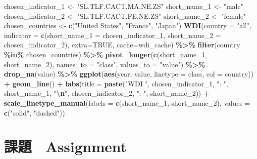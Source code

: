 \documentclass[
  xelatex, ja=standard]{bxjsbook}
\newenvironment{Shaded}{\begin{snugshade}}{\end{snugshade}}
\newcommand{\AttributeTok}[1]{\textcolor[rgb]{0.13,0.29,0.53}{#1}}
\newcommand{\ConstantTok}[1]{\textcolor[rgb]{0.56,0.35,0.01}{#1}}
\newcommand{\FunctionTok}[1]{\textcolor[rgb]{0.13,0.29,0.53}{\textbf{#1}}}
\newcommand{\NormalTok}[1]{#1}
\newcommand{\OtherTok}[1]{\textcolor[rgb]{0.56,0.35,0.01}{#1}}
\newcommand{\SpecialCharTok}[1]{\textcolor[rgb]{0.81,0.36,0.00}{\textbf{#1}}}
\newcommand{\StringTok}[1]{\textcolor[rgb]{0.31,0.60,0.02}{#1}}
\theoremstyle{definition}
\theoremstyle{definition}
\theoremstyle{definition}
\theoremstyle{definition}
\theoremstyle{remark}
\begin{document}
\begin{Shaded}
\begin{Highlighting}[]
\NormalTok{chosen\_indicator\_1 }\OtherTok{\textless{}{-}} \StringTok{"SL.TLF.CACT.MA.NE.ZS"}
\NormalTok{short\_name\_1 }\OtherTok{\textless{}{-}} \StringTok{"male"}
\NormalTok{chosen\_indicator\_2 }\OtherTok{\textless{}{-}} \StringTok{"SL.TLF.CACT.FE.NE.ZS"}
\NormalTok{short\_name\_2 }\OtherTok{\textless{}{-}} \StringTok{"female"}
\NormalTok{chosen\_countries }\OtherTok{\textless{}{-}} \FunctionTok{c}\NormalTok{(}\StringTok{"United States"}\NormalTok{, }\StringTok{"France"}\NormalTok{, }\StringTok{"Japan"}\NormalTok{)}
\FunctionTok{WDI}\NormalTok{(}\AttributeTok{country =} \StringTok{"all"}\NormalTok{, }\AttributeTok{indicator =} \FunctionTok{c}\NormalTok{(}\AttributeTok{short\_name\_1 =}\NormalTok{ chosen\_indicator\_1, }\AttributeTok{short\_name\_2 =}\NormalTok{ chosen\_indicator\_2), }\AttributeTok{extra=}\ConstantTok{TRUE}\NormalTok{, }\AttributeTok{cache=}\NormalTok{wdi\_cache) }\SpecialCharTok{\%\textgreater{}\%} 
  \FunctionTok{filter}\NormalTok{(country }\SpecialCharTok{\%in\%}\NormalTok{ chosen\_countries) }\SpecialCharTok{\%\textgreater{}\%} 
  \FunctionTok{pivot\_longer}\NormalTok{(}\FunctionTok{c}\NormalTok{(short\_name\_1, short\_name\_2), }\AttributeTok{names\_to =} \StringTok{"class"}\NormalTok{, }\AttributeTok{values\_to =} \StringTok{"value"}\NormalTok{) }\SpecialCharTok{\%\textgreater{}\%} \FunctionTok{drop\_na}\NormalTok{(value) }\SpecialCharTok{\%\textgreater{}\%}
  \FunctionTok{ggplot}\NormalTok{(}\FunctionTok{aes}\NormalTok{(year, value, }\AttributeTok{linetype =}\NormalTok{ class, }\AttributeTok{col =}\NormalTok{ country)) }\SpecialCharTok{+} \FunctionTok{geom\_line}\NormalTok{() }\SpecialCharTok{+}
  \FunctionTok{labs}\NormalTok{(}\AttributeTok{title =} \FunctionTok{paste}\NormalTok{(}\StringTok{"WDI "}\NormalTok{, chosen\_indicator\_1, }\StringTok{": "}\NormalTok{, short\_name\_1, }\StringTok{"}\SpecialCharTok{\textbackslash{}n}\StringTok{"}\NormalTok{, chosen\_indicator\_2, }\StringTok{": "}\NormalTok{, short\_name\_2)) }\SpecialCharTok{+}
  \FunctionTok{scale\_linetype\_manual}\NormalTok{(}\AttributeTok{labels =} \FunctionTok{c}\NormalTok{(short\_name\_1, short\_name\_2), }\AttributeTok{values =} \FunctionTok{c}\NormalTok{(}\StringTok{"solid"}\NormalTok{, }\StringTok{"dashed"}\NormalTok{))}
\end{Highlighting}
\end{Shaded}

\hypertarget{ux8ab2ux984c-assignment}{%
\section{課題　Assignment}\label{ux8ab2ux984c-assignment}}
\end{document}
